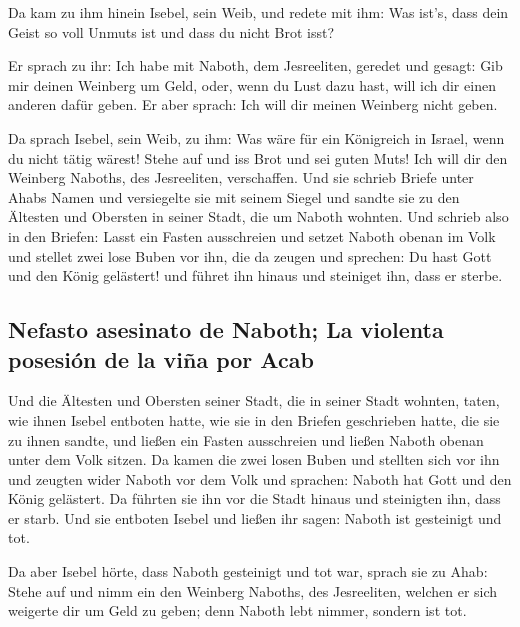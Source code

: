  Da kam zu ihm hinein Isebel, sein Weib, und redete mit
ihm: Was ist's, dass dein Geist so voll Unmuts ist und dass du nicht
Brot isst?

 Er sprach zu ihr: Ich habe mit Naboth, dem Jesreeliten,
geredet und gesagt: Gib mir deinen Weinberg um Geld, oder, wenn du Lust
dazu hast, will ich dir einen anderen dafür geben. Er aber sprach: Ich
will dir meinen Weinberg nicht geben.

 Da sprach Isebel, sein Weib, zu ihm: Was wäre für ein
Königreich in Israel, wenn du nicht tätig wärest! Stehe auf und iss Brot
und sei guten Muts! Ich will dir den Weinberg Naboths, des Jesreeliten,
verschaffen.  Und sie schrieb Briefe unter Ahabs Namen und
versiegelte sie mit seinem Siegel und sandte sie zu den Ältesten und
Obersten in seiner Stadt, die um Naboth wohnten.  Und
schrieb also in den Briefen: Lasst ein Fasten ausschreien und setzet
Naboth obenan im Volk  und stellet zwei lose Buben vor
ihn, die da zeugen und sprechen: Du hast Gott und den König gelästert!
und führet ihn hinaus und steiniget ihn, dass er sterbe.

\hypertarget{nefasto-asesinato-de-naboth-la-violenta-posesiuxf3n-de-la-viuxf1a-por-acab}{%
\subsection{Nefasto asesinato de Naboth; La violenta posesión de la viña
por
Acab}\label{nefasto-asesinato-de-naboth-la-violenta-posesiuxf3n-de-la-viuxf1a-por-acab}}

 Und die Ältesten und Obersten seiner Stadt, die in
seiner Stadt wohnten, taten, wie ihnen Isebel entboten hatte, wie sie in
den Briefen geschrieben hatte, die sie zu ihnen sandte, 
und ließen ein Fasten ausschreien und ließen Naboth obenan unter dem
Volk sitzen.  Da kamen die zwei losen Buben und stellten
sich vor ihn und zeugten wider Naboth vor dem Volk und sprachen: Naboth
hat Gott und den König gelästert. Da führten sie ihn vor die Stadt
hinaus und steinigten ihn, dass er starb.  Und sie
entboten Isebel und ließen ihr sagen: Naboth ist gesteinigt und tot.

 Da aber Isebel hörte, dass Naboth gesteinigt und tot
war, sprach sie zu Ahab: Stehe auf und nimm ein den Weinberg Naboths,
des Jesreeliten, welchen er sich weigerte dir um Geld zu geben; denn
Naboth lebt nimmer, sondern ist tot.

